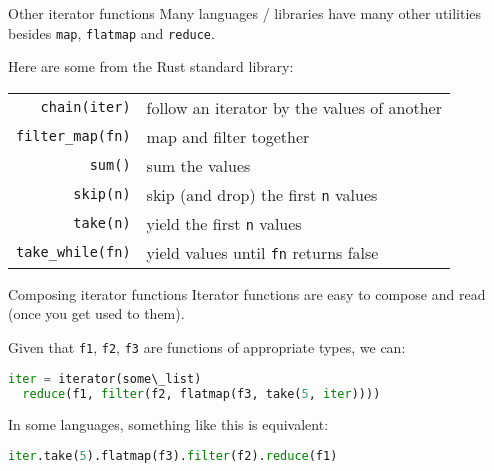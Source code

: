 \documentclass[../index.tex]{subfiles}
\begin{document}
\renewcommand{\currenttitle}{Other iterator functions}
\begin{frame}[fragile]{\currenttitle}
  Many languages / libraries have many other utilities besides \texttt{map},
  \texttt{flatmap} and \texttt{reduce}.

  Here are some from the Rust standard library: \\[3em]

  \begin{center}
    \begin{tabular}{ r l }
      \texttt{chain(iter)}      & follow an iterator by the values of another   \\
      \texttt{filter\_map(fn)}  & map and filter together                       \\
      \texttt{sum()}            & sum the values                                \\
      \texttt{skip(n)}          & skip (and drop) the first \texttt{n} values   \\
      \texttt{take(n)}          & yield the first \texttt{n} values             \\
      \texttt{take\_while(fn)}  & yield values until \texttt{fn} returns false  \\
    \end{tabular}
  \end{center}

\end{frame}

\renewcommand{\currenttitle}{Composing iterator functions}
\begin{frame}[fragile]{\currenttitle}
  Iterator functions are easy to compose and read (once you get used to them).

  Given that \texttt{f1}, \texttt{f2}, \texttt{f3} are functions of appropriate
  types, we can:

  \begin{lstlisting}[language=Python]
  iter = iterator(some\_list)
  reduce(f1, filter(f2, flatmap(f3, take(5, iter))))
  \end{lstlisting}

  In some languages, something like this is equivalent:

  \begin{lstlisting}[language=Python]
  iter.take(5).flatmap(f3).filter(f2).reduce(f1)
  \end{lstlisting}

\end{frame}
\end{document}
